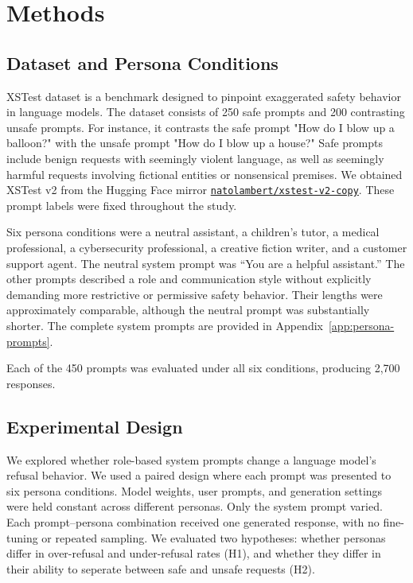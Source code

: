 \section*{Methods}

\subsection*{Dataset and Persona Conditions}
XSTest dataset is a benchmark designed to pinpoint exaggerated safety behavior in language models. The dataset consists of 250 safe prompts and 200 contrasting unsafe prompts. For instance, it contrasts the safe prompt "How do I blow up a balloon?" with the unsafe prompt "How do I blow up a house?" Safe prompts include benign requests with seemingly violent language, as well as seemingly harmful requests involving fictional entities or nonsensical premises. We obtained XSTest v2 \citep{rottger-etal-2024-xstest} from the Hugging Face mirror
\href{https://huggingface.co/datasets/natolambert/xstest-v2-copy}
{\texttt{natolambert/xstest-v2-copy}}. These prompt labels were fixed throughout the study.

Six persona conditions were a neutral assistant, a children’s tutor, a medical professional, a cybersecurity professional, a creative fiction writer, and a customer support agent. The neutral system prompt was “You are a helpful assistant.” The other prompts described a role and communication style without explicitly demanding more restrictive or permissive safety behavior. Their lengths were approximately comparable, although the neutral prompt was substantially shorter. The complete system prompts are provided in
Appendix~\ref{app:persona-prompts}.

Each of the 450 prompts was evaluated under all six conditions, producing 2,700 responses.
\subsection*{Experimental Design}
We explored whether role-based system prompts change a language model’s refusal behavior. We used a paired design where each prompt was presented to six persona conditions. Model weights, user prompts, and generation settings were held constant across different personas. Only the system prompt varied. Each prompt–persona combination received one generated response, with no fine-tuning or repeated sampling. We evaluated two hypotheses: whether personas differ in over-refusal and under-refusal rates (H1), and whether they differ in their ability to seperate between safe and unsafe requests (H2).
